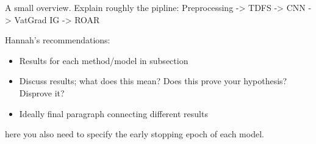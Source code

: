 A small overview. Explain roughly the pipline: Preprocessing -> TDFS -> CNN -> VatGrad IG -> ROAR

Hannah's recommendations:
\begin{itemize}
  \item Results for each method/model in subsection
  \item Discuss results; what does this mean? Does this prove your hypothesis? Disprove it?
  \item Ideally final paragraph connecting different results
\end{itemize}

here you also need to specify the early stopping epoch of each model.

